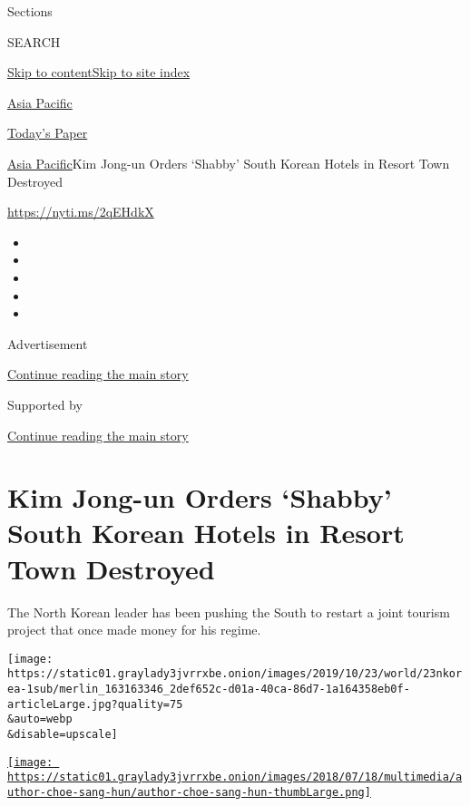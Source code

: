 Sections

SEARCH

\protect\hyperlink{site-content}{Skip to
content}\protect\hyperlink{site-index}{Skip to site index}

\href{https://www.nytimes3xbfgragh.onion/section/world/asia}{Asia
Pacific}

\href{https://myaccount.nytimes3xbfgragh.onion/auth/login?response_type=cookie\&client_id=vi}{}

\href{https://www.nytimes3xbfgragh.onion/section/todayspaper}{Today's
Paper}

\href{/section/world/asia}{Asia Pacific}\textbar{}Kim Jong-un Orders
`Shabby' South Korean Hotels in Resort Town Destroyed

\url{https://nyti.ms/2qEHdkX}

\begin{itemize}
\item
\item
\item
\item
\item
\end{itemize}

Advertisement

\protect\hyperlink{after-top}{Continue reading the main story}

Supported by

\protect\hyperlink{after-sponsor}{Continue reading the main story}

\hypertarget{kim-jong-un-orders-shabby-south-korean-hotels-in-resort-town-destroyed}{%
\section{Kim Jong-un Orders `Shabby' South Korean Hotels in Resort Town
Destroyed}\label{kim-jong-un-orders-shabby-south-korean-hotels-in-resort-town-destroyed}}

The North Korean leader has been pushing the South to restart a joint
tourism project that once made money for his regime.

\texttt{[image: https://static01.graylady3jvrrxbe.onion/images/2019/10/23/world/23nkorea-1sub/merlin\_163163346\_2def652c-d01a-40ca-86d7-1a164358eb0f-articleLarge.jpg?quality=75\\\&auto=webp\\\&disable=upscale]}

\href{https://www.nytimes3xbfgragh.onion/by/choe-sang-hun}{\texttt{[image: https://static01.graylady3jvrrxbe.onion/images/2018/07/18/multimedia/author-choe-sang-hun/author-choe-sang-hun-thumbLarge.png]}}

